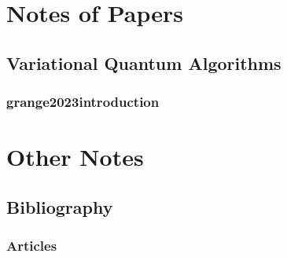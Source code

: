 \documentclass[
	11pt, %
	fleqn, %
	a4paper, %
]{LegrandOrangeBook}
\begin{document}

\part{Notes of Papers}


\chapter{Variational Quantum Algorithms}

\section{grange2023introduction}




\part{Other Notes}



\chapter*{Bibliography}

\section*{Articles}

\printbibliography[heading=bibempty, type=article] %
\end{document}
